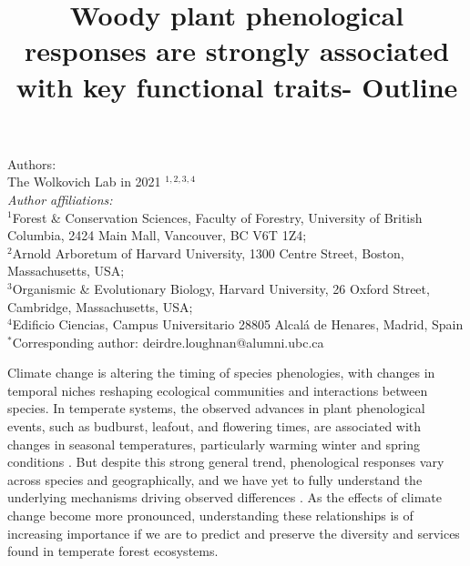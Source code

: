 \documentclass{article}\usepackage[]{graphicx}\usepackage[]{color}
\title{Woody plant phenological responses are strongly associated with key functional traits- Outline}
\begin{document}
\maketitle

\noindent Authors:\\
The Wolkovich Lab in 2021 $^{1,2,3,4}$
\vspace{2ex}\\
\emph{Author affiliations:}\\
$^{1}$Forest \& Conservation Sciences, Faculty of Forestry, University of British Columbia, 2424 Main Mall, Vancouver, BC V6T 1Z4;\\
$^{2}$Arnold Arboretum of Harvard University, 1300 Centre Street, Boston, Massachusetts, USA;\\
$^{3}$Organismic \& Evolutionary Biology, Harvard University, 26 Oxford Street, Cambridge, Massachusetts, USA;\\
$^{4}$Edificio Ciencias, Campus Universitario 28805 Alcalá de Henares, Madrid, Spain\\
 

\vspace{2ex}
$^*$Corresponding author: deirdre.loughnan@alumni.ubc.ca\\
\renewcommand{\thetable}{\arabic{table}}
\renewcommand{\thefigure}{\arabic{figure}}
\renewcommand{\labelitemi}{$-$}

Climate change is altering the timing of species phenologies, with changes in temporal niches reshaping ecological communities and interactions between species. In temperate systems, the observed advances in plant phenological events, such as budburst, leafout, and flowering times, are associated with changes in seasonal temperatures, particularly warming winter and spring conditions \citep{Menzel2006,Fitter2002}. But despite this strong general trend, phenological responses vary across species and geographically, and we have yet to fully understand the underlying mechanisms driving observed differences \citep{Chuine2010,Morin2009}. As the effects of climate change become more pronounced, understanding these relationships is of increasing importance if we are to predict and preserve the diversity and services found in temperate forest ecosystems. %
\end{document}
